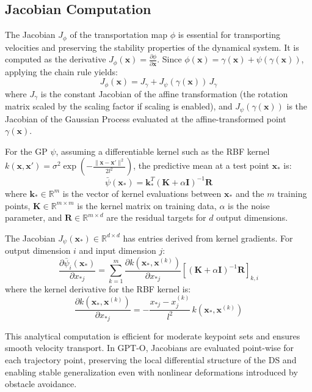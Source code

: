 \documentclass[a4paper, 10pt, conference]{ieeeconf}
\begin{document}
\subsection{Jacobian Computation}

The Jacobian \(J_\phi\) of the transportation map \(\phi\) is essential for transporting velocities and preserving the stability properties of the dynamical system.
It is computed as the derivative \(J_\phi(\mathbf{x}) = \frac{\partial \phi}{\partial \mathbf{x}}\).
Since \(\phi(\mathbf{x}) = \gamma(\mathbf{x}) + \psi(\gamma(\mathbf{x}))\), applying the chain rule yields:
\[
    J_\phi(\mathbf{x}) = J_\gamma + J_\psi(\gamma(\mathbf{x})) \, J_\gamma
\]
where \(J_\gamma\) is the constant Jacobian of the affine transformation (the rotation matrix scaled by the scaling factor if scaling is enabled), and \(J_\psi(\gamma(\mathbf{x}))\) is the Jacobian of the Gaussian Process evaluated at the affine-transformed point \(\gamma(\mathbf{x})\).

For the GP \(\psi\), assuming a differentiable kernel such as the RBF kernel \(k(\mathbf{x}, \mathbf{x}') = \sigma^2 \exp\left(-\frac{\|\mathbf{x} - \mathbf{x}'\|^2}{2l^2}\right)\), the predictive mean at a test point \(\mathbf{x}_*\) is:
\[
    \bar{\psi}(\mathbf{x}_*) = \mathbf{k}_*^T {(\mathbf{K} + \alpha \mathbf{I})}^{-1} \mathbf{R}
\]
where \(\mathbf{k}_* \in \mathbb{R}^m\) is the vector of kernel evaluations between \(\mathbf{x}_*\) and the \(m\) training points, \(\mathbf{K} \in \mathbb{R}^{m \times m}\) is the kernel matrix on training data, \(\alpha\) is the noise parameter, and \(\mathbf{R} \in \mathbb{R}^{m \times d}\) are the residual targets for \(d\) output dimensions.

The Jacobian \(J_\psi(\mathbf{x}_*) \in \mathbb{R}^{d \times d}\) has entries derived from kernel gradients. For output dimension \(i\) and input dimension \(j\):
\[
    \frac{\partial \bar{\psi}_i(\mathbf{x}_*)}{\partial x_{*j}} = \sum_{k=1}^{m} \frac{\partial k(\mathbf{x}_*, \mathbf{x}^{(k)})}{\partial x_{*j}} {\left[ {(\mathbf{K} + \alpha \mathbf{I})}^{-1} \mathbf{R} \right]}_{k,i}
\]
where the kernel derivative for the RBF kernel is:
\[
    \frac{\partial k(\mathbf{x}_*, \mathbf{x}^{(k)})}{\partial x_{*j}} = -\frac{x_{*j} - x^{(k)}_j}{l^2} \, k(\mathbf{x}_*, \mathbf{x}^{(k)})
\]

This analytical computation is efficient for moderate keypoint sets and ensures smooth velocity transport.
In GPT-O, Jacobians are evaluated point-wise for each trajectory point, preserving the local differential structure of the DS and enabling stable generalization even with nonlinear deformations introduced by obstacle avoidance.
\end{document}
